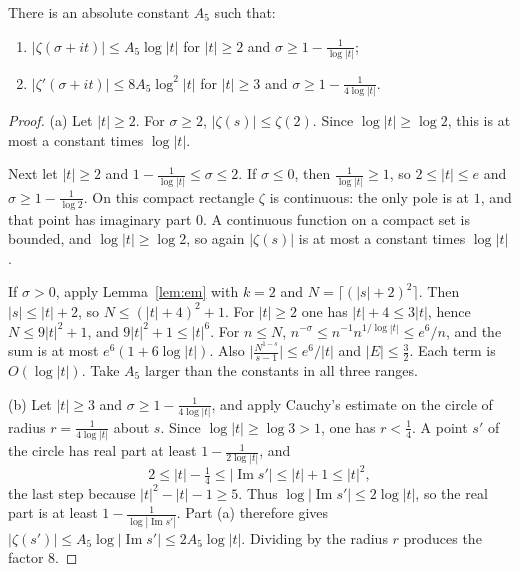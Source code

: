 \begin{lemma}\label{lem:zetaline}
There is an absolute constant $A_5$ such that:
\begin{enumerate}[label=(\alph*)]
\item $|\zeta(\sigma+it)|\le A_5\log|t|$ for $|t|\ge2$ and $\sigma\ge1-\frac1{\log|t|}$;
\item $|\zeta'(\sigma+it)|\le8A_5\log^2|t|$ for $|t|\ge3$ and $\sigma\ge1-\frac1{4\log|t|}$.
\end{enumerate}
\end{lemma}
\begin{proof}
(a) Let $|t|\ge2$. For $\sigma\ge2$, $|\zeta(s)|\le\zeta(2)$. Since $\log|t|\ge\log2$, this is at most a constant times $\log|t|$.

Next let $|t|\ge2$ and $1-\frac1{\log|t|}\le\sigma\le2$. If $\sigma\le0$, then $\frac1{\log|t|}\ge1$, so $2\le|t|\le e$ and $\sigma\ge1-\frac1{\log2}$. On this compact rectangle $\zeta$ is continuous: the only pole is at $1$, and that point has imaginary part $0$. A continuous function on a compact set is bounded, and $\log|t|\ge\log2$, so again $|\zeta(s)|$ is at most a constant times $\log|t|$.

If $\sigma>0$, apply Lemma~\ref{lem:em} with $k=2$ and $N=\lceil(|s|+2)^2\rceil$. Then $|s|\le|t|+2$, so $N\le(|t|+4)^2+1$. For $|t|\ge2$ one has $|t|+4\le3|t|$, hence $N\le9|t|^2+1$, and $9|t|^2+1\le|t|^6$. For $n\le N$, $n^{-\sigma}\le n^{-1}n^{1/\log|t|}\le e^6/n$, and the sum is at most $e^6(1+6\log|t|)$. Also $\bigl|\frac{N^{1-s}}{s-1}\bigr|\le e^6/|t|$ and $|E|\le\frac32$. Each term is $O(\log|t|)$. Take $A_5$ larger than the constants in all three ranges.

(b) Let $|t|\ge3$ and $\sigma\ge1-\frac1{4\log|t|}$, and apply Cauchy's estimate on the circle of radius $r=\frac1{4\log|t|}$ about $s$. Since $\log|t|\ge\log3>1$, one has $r<\frac14$. A point $s'$ of the circle has real part at least $1-\frac1{2\log|t|}$, and
\[
2\le|t|-\tfrac14\le|\operatorname{Im}s'|\le|t|+1\le|t|^2,
\]
the last step because $|t|^2-|t|-1\ge5$. Thus $\log|\operatorname{Im}s'|\le2\log|t|$, so the real part is at least $1-\frac1{\log|\operatorname{Im}s'|}$. Part (a) therefore gives $|\zeta(s')|\le A_5\log|\operatorname{Im}s'|\le2A_5\log|t|$. Dividing by the radius $r$ produces the factor $8$.
\end{proof}


